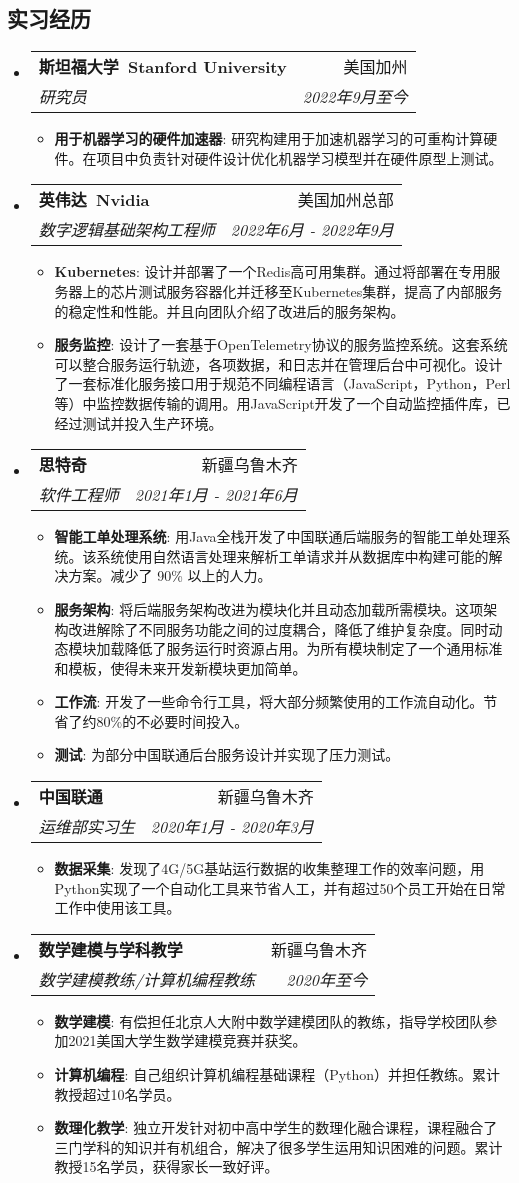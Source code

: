 \documentclass[letterpaper,11pt]{article}
\makeatletter
\newcommand{\resumeItem}[2]{
  \item\small{
    \textbf{#1}{: #2 \vspace{-2pt}}
  }
}
\newcommand{\resumeSubheading}[4]{
  \vspace{-1pt}\item
    \begin{tabular*}{0.97\textwidth}[t]{l@{\extracolsep{\fill}}r}
      \textbf{#1} & #2 \\
      \textit{\small#3} & \textit{\small #4} \\
    \end{tabular*}\vspace{-5pt}
}
\newcommand{\resumeSubHeadingListStart}{\begin{itemize}[leftmargin=*]}
\newcommand{\resumeSubHeadingListEnd}{\end{itemize}}
\newcommand{\resumeItemListStart}{\begin{itemize}}
\newcommand{\resumeItemListEnd}{\end{itemize}\vspace{-5pt}}
\makeatother
\begin{document}
\begin{CJK*}{UTF8}{gbsn}
\section{实习经历}
  \resumeSubHeadingListStart
    \resumeSubheading
      {斯坦福大学\ Stanford University}{美国加州}
      {研究员}{2022年9月至今}
      \resumeItemListStart
        \resumeItem{用于机器学习的硬件加速器}
          {研究构建用于加速机器学习的可重构计算硬件。在项目中负责针对硬件设计优化机器学习模型并在硬件原型上测试。}
      \resumeItemListEnd
    \resumeSubheading
      {英伟达\ Nvidia}{美国加州总部}
      {数字逻辑基础架构工程师}{2022年6月 - 2022年9月}
      \resumeItemListStart
        \resumeItem{Kubernetes}
          {设计并部署了一个Redis高可用集群。通过将部署在专用服务器上的芯片测试服务容器化并迁移至Kubernetes集群，提高了内部服务的稳定性和性能。并且向团队介绍了改进后的服务架构。}
        \resumeItem{服务监控}
          {设计了一套基于OpenTelemetry协议的服务监控系统。这套系统可以整合服务运行轨迹，各项数据，和日志并在管理后台中可视化。设计了一套标准化服务接口用于规范不同编程语言（JavaScript，Python，Perl等）中监控数据传输的调用。用JavaScript开发了一个自动监控插件库，已经过测试并投入生产环境。}
      \resumeItemListEnd
    \resumeSubheading
      {思特奇}{新疆乌鲁木齐}
      {软件工程师}{2021年1月 - 2021年6月}
      \resumeItemListStart
        \resumeItem{智能工单处理系统}
          {用Java全栈开发了中国联通后端服务的智能工单处理系统。该系统使用自然语言处理来解析工单请求并从数据库中构建可能的解决方案。减少了 90\% 以上的人力。}
        \resumeItem{服务架构}
          {将后端服务架构改进为模块化并且动态加载所需模块。这项架构改进解除了不同服务功能之间的过度耦合，降低了维护复杂度。同时动态模块加载降低了服务运行时资源占用。为所有模块制定了一个通用标准和模板，使得未来开发新模块更加简单。}
        \resumeItem{工作流}
          {开发了一些命令行工具，将大部分频繁使用的工作流自动化。节省了约80\%的不必要时间投入。}
        \resumeItem{测试}
          {为部分中国联通后台服务设计并实现了压力测试。}
      \resumeItemListEnd
    \resumeSubheading
      {中国联通}{新疆乌鲁木齐}
      {运维部实习生}{2020年1月 - 2020年3月}
      \resumeItemListStart
        \resumeItem{数据采集}
          {发现了4G/5G基站运行数据的收集整理工作的效率问题，用Python实现了一个自动化工具来节省人工，并有超过50个员工开始在日常工作中使用该工具。}
      \resumeItemListEnd
    \resumeSubheading
      {数学建模与学科教学}{新疆乌鲁木齐}
      {数学建模教练/计算机编程教练}{2020年至今}
      \resumeItemListStart
        \resumeItem{数学建模}
          {有偿担任北京人大附中数学建模团队的教练，指导学校团队参加2021美国大学生数学建模竞赛并获奖。}
        \resumeItem{计算机编程}
          {自己组织计算机编程基础课程（Python）并担任教练。累计教授超过10名学员。}
        \resumeItem{数理化教学}
          {独立开发针对初中高中学生的数理化融合课程，课程融合了三门学科的知识并有机组合，解决了很多学生运用知识困难的问题。累计教授15名学员，获得家长一致好评。}
      \resumeItemListEnd
  \resumeSubHeadingListEnd

\end{CJK*}
\end{document}
